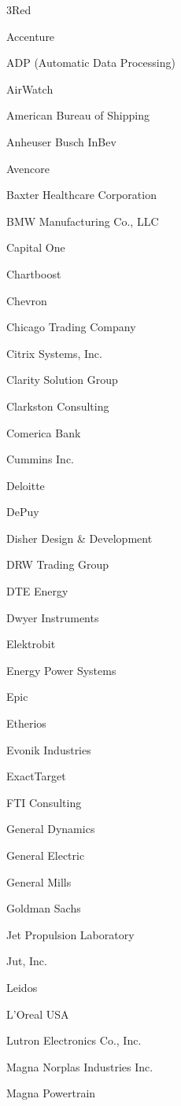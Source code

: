 \documentclass[twoside]{article}
\begin{document}
\begin{center}
\begin{multicols}{5}
\begin{FlushLeft}
\begin{compactitem}
        \item 3Red
\item Accenture
\item ADP (Automatic Data Processing)
\item AirWatch
\item American Bureau of Shipping
\item Anheuser Busch InBev
\item Avencore
\item Baxter Healthcare Corporation
\item BMW Manufacturing Co., LLC
\item Capital One
\item Chartboost
\item Chevron
\item Chicago Trading Company
\item Citrix Systems, Inc.
\item Clarity Solution Group
\item Clarkston Consulting
\item Comerica Bank
\item Cummins Inc.
\item Deloitte
\item DePuy
\item Disher Design \& Development
\item DRW Trading Group
\item DTE Energy
\item Dwyer Instruments
\item Elektrobit
\item Energy Power Systems
\item Epic
\item Etherios
\item Evonik Industries
\item ExactTarget
\item FTI Consulting
\item General Dynamics
\item General Electric
\item General Mills
\item Goldman Sachs
\item Jet Propulsion Laboratory
\item Jut, Inc.
\item Leidos
\item L'Oreal USA
\item Lutron Electronics Co., Inc.
\item Magna Norplas Industries Inc.
\item Magna Powertrain

\end{compactitem}
\end{FlushLeft}
\end{multicols}
\end{center}
\end{document}
